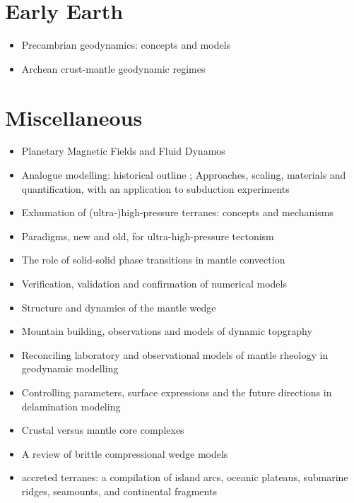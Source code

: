 \section{Early Earth}
   \begin{itemize}
   \item[2014] Precambrian geodynamics: concepts and models \cite{gery14}
   \item[2022] Archean crust-mantle geodynamic regimes \cite{libs22}
   \end{itemize}


\section{Miscellaneous}
\begin{itemize}
\item Planetary Magnetic Fields and Fluid Dynamos \cite{jone11}
\item Analogue modelling: historical outline \cite{koyi97}; Approaches, scaling, materials and quantification, with an application to subduction experiments \cite{scst16}
\item Exhumation of (ultra-)high-pressure terranes: concepts and mechanisms \cite{warr13}
\item Paradigms, new and old, for ultra-high-pressure tectonism \cite{hage13}
\item The role of solid-solid phase transitions in mantle convection \cite{fada17}
\item Verification, validation and confirmation of numerical models \cite{orsb94}
\item Structure and dynamics of the mantle wedge \cite{vank03}
\item Mountain building, observations and models of dynamic topgraphy \cite{flgm13,fabc13}
\item Reconciling laboratory and observational models of mantle rheology in geodynamic modelling \cite{king16}
\item Controlling parameters, surface expressions and the future directions in delamination modeling \cite{goue18}
\item Crustal versus mantle core complexes \cite{brst18}
\item A review of brittle compressional wedge models \cite{buit12}
\item accreted terranes: a compilation of island arcs, oceanic
      plateaus, submarine ridges, seamounts, and continental fragments \cite{tebu14}

\end{itemize}
